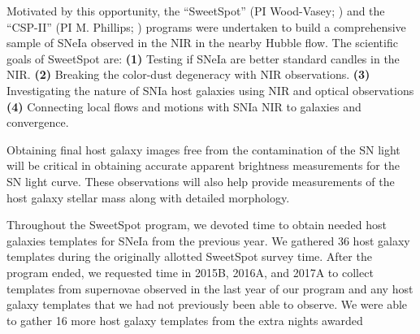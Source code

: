 \documentclass[11pt]{article}
\begin{document}
Motivated by this opportunity, the ``SweetSpot'' (PI Wood-Vasey; \cite{weyant14}) and the ``CSP-II'' (PI M. Phillips; \cite{contreras10,stritzinger11}) programs were undertaken to build a comprehensive sample of SNeIa observed in the NIR in the nearby Hubble flow.
The scientific goals of SweetSpot are:
{\bf (1)}
Testing if SNeIa are better standard candles in the NIR.
{\bf (2)}
Breaking the color-dust degeneracy with NIR observations.
{\bf (3)}
Investigating the nature of SNIa host galaxies using NIR and optical observations
{\bf (4)}
Connecting local flows and motions with SNIa NIR to galaxies and convergence.

Obtaining final host galaxy images free from the contamination of the SN light will be critical in obtaining accurate apparent brightness measurements for the SN light curve.  These observations will also help provide measurements of the host galaxy stellar mass along with detailed morphology.

Throughout the SweetSpot program, we devoted time to obtain needed host galaxies templates for SNeIa from the previous year.  
We gathered 36 host galaxy templates during the originally allotted SweetSpot survey time. 
After the program ended, we requested time in 2015B, 2016A, and 2017A to collect templates from supernovae observed in the last year of our program and any host galaxy templates that we had not previously been able to observe. 
We were able to gather 16 more host galaxy templates from the extra nights awarded 
\end{document}
